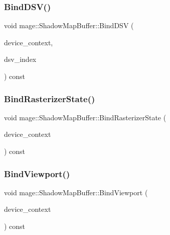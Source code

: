 \subsubsection{\texorpdfstring{Bind\+D\+S\+V()}{BindDSV()}}
{\footnotesize\ttfamily void mage\+::\+Shadow\+Map\+Buffer\+::\+Bind\+D\+SV (\begin{DoxyParamCaption}\item[{I\+D3\+D11\+Device\+Context4 $\ast$}]{device\+\_\+context,  }\item[{size\+\_\+t}]{dsv\+\_\+index }\end{DoxyParamCaption}) const\hspace{0.3cm}{\ttfamily [noexcept]}}

\hypertarget{structmage_1_1_shadow_map_buffer_a4f71a1a486049ab2455af83f6a4c0f28}{}\label{structmage_1_1_shadow_map_buffer_a4f71a1a486049ab2455af83f6a4c0f28} 
\subsubsection{\texorpdfstring{Bind\+Rasterizer\+State()}{BindRasterizerState()}}
{\footnotesize\ttfamily void mage\+::\+Shadow\+Map\+Buffer\+::\+Bind\+Rasterizer\+State (\begin{DoxyParamCaption}\item[{I\+D3\+D11\+Device\+Context4 $\ast$}]{device\+\_\+context }\end{DoxyParamCaption}) const\hspace{0.3cm}{\ttfamily [noexcept]}}

\hypertarget{structmage_1_1_shadow_map_buffer_ae0d097c959ff2cdb2aabdd246c654039}{}\label{structmage_1_1_shadow_map_buffer_ae0d097c959ff2cdb2aabdd246c654039} 
\subsubsection{\texorpdfstring{Bind\+Viewport()}{BindViewport()}}
{\footnotesize\ttfamily void mage\+::\+Shadow\+Map\+Buffer\+::\+Bind\+Viewport (\begin{DoxyParamCaption}\item[{I\+D3\+D11\+Device\+Context4 $\ast$}]{device\+\_\+context }\end{DoxyParamCaption}) const\hspace{0.3cm}{\ttfamily [noexcept]}}


